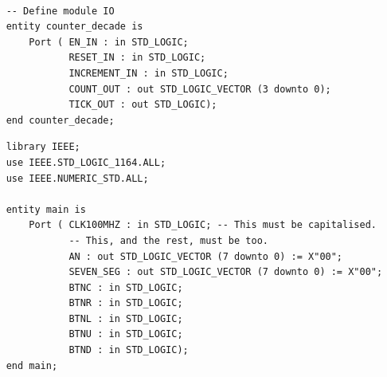 \documentclass[11pt]{article}
\newenvironment{code}{\captionsetup{type=listing}}{}
\begin{document}
\begin{code}
  \begin{verbatim}
  
    -- Define module IO
    entity counter_decade is
        Port ( EN_IN : in STD_LOGIC;
               RESET_IN : in STD_LOGIC;
               INCREMENT_IN : in STD_LOGIC;
               COUNT_OUT : out STD_LOGIC_VECTOR (3 downto 0);
               TICK_OUT : out STD_LOGIC);
    end counter_decade;

  \end{verbatim}
  \captionsetup{belowskip=0pt}
  \label{code:entity_naming_convention}
\end{code}

\vspace*{1cm}

\begin{code}
  \begin{verbatim}
    library IEEE;
    use IEEE.STD_LOGIC_1164.ALL;
    use IEEE.NUMERIC_STD.ALL;

    entity main is
        Port ( CLK100MHZ : in STD_LOGIC; -- This must be capitalised.
               -- This, and the rest, must be too.
               AN : out STD_LOGIC_VECTOR (7 downto 0) := X"00"; 
               SEVEN_SEG : out STD_LOGIC_VECTOR (7 downto 0) := X"00";
               BTNC : in STD_LOGIC;
               BTNR : in STD_LOGIC;
               BTNL : in STD_LOGIC;
               BTNU : in STD_LOGIC;
               BTND : in STD_LOGIC);  
    end main;
  \end{verbatim}
  \captionsetup{belowskip=0pt}
  \label{code:case}
\end{code}

\vspace*{1cm}
\end{document}
